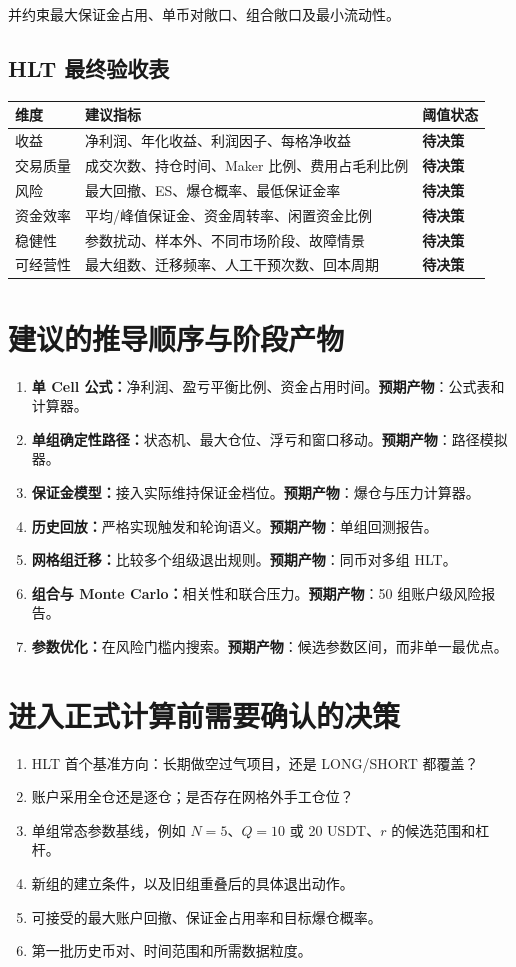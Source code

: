 \documentclass[11pt,a4paper,fontset=none]{ctexart}
\newcommand{\decisionitem}{\textcolor{ResearchRed}{\textbf{待决策}}}
\newcommand{\outputitem}{\textcolor{ResearchGreen}{\textbf{预期产物}}}
\begin{document}
并约束最大保证金占用、单币对敞口、组合敞口及最小流动性。

\subsection{HLT 最终验收表}

\begin{longtable}{p{3.6cm}p{6.0cm}p{4.1cm}}
  \toprule
  维度 & 建议指标 & 阈值状态 \\
  \midrule
  \endhead
  收益 & 净利润、年化收益、利润因子、每格净收益 & \decisionitem \\
  交易质量 & 成交次数、持仓时间、Maker 比例、费用占毛利比例 & \decisionitem \\
  风险 & 最大回撤、ES、爆仓概率、最低保证金率 & \decisionitem \\
  资金效率 & 平均/峰值保证金、资金周转率、闲置资金比例 & \decisionitem \\
  稳健性 & 参数扰动、样本外、不同市场阶段、故障情景 & \decisionitem \\
  可经营性 & 最大组数、迁移频率、人工干预次数、回本周期 & \decisionitem \\
  \bottomrule
\end{longtable}

\section{建议的推导顺序与阶段产物}

\begin{enumerate}
  \item \textbf{单 Cell 公式：}净利润、盈亏平衡比例、资金占用时间。\outputitem：公式表和计算器。
  \item \textbf{单组确定性路径：}状态机、最大仓位、浮亏和窗口移动。\outputitem：路径模拟器。
  \item \textbf{保证金模型：}接入实际维持保证金档位。\outputitem：爆仓与压力计算器。
  \item \textbf{历史回放：}严格实现触发和轮询语义。\outputitem：单组回测报告。
  \item \textbf{网格组迁移：}比较多个组级退出规则。\outputitem：同币对多组 HLT。
  \item \textbf{组合与 Monte Carlo：}相关性和联合压力。\outputitem：50 组账户级风险报告。
  \item \textbf{参数优化：}在风险门槛内搜索。\outputitem：候选参数区间，而非单一最优点。
\end{enumerate}

\section{进入正式计算前需要确认的决策}

\begin{enumerate}
  \item HLT 首个基准方向：长期做空过气项目，还是 LONG/SHORT 都覆盖？
  \item 账户采用全仓还是逐仓；是否存在网格外手工仓位？
  \item 单组常态参数基线，例如 $N=5$、$Q=10$ 或 20 USDT、$r$ 的候选范围和杠杆。
  \item 新组的建立条件，以及旧组重叠后的具体退出动作。
  \item 可接受的最大账户回撤、保证金占用率和目标爆仓概率。
  \item 第一批历史币对、时间范围和所需数据粒度。
\end{enumerate}
\end{document}
